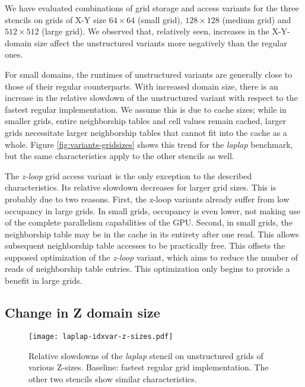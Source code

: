We have evaluated combinations of grid storage and access variants for the three stencils on grids of X-Y size $64\times 64$ (small grid), $128\times 128$ (medium grid) and $512\times 512$ (large grid). We observed that, relatively seen, increases in the X-Y-domain size affect the unstructured variants more negatively than the regular ones.

For small domains, the runtimes of unstructured variants are generally close to those of their regular counterparts. With increased domain size, there is an increase in the relative slowdown of the unstructured variant with respect to the fastest regular implementation. We assume this is due to cache sizes; while in smaller grids, entire neighborship tables and cell values remain cached, larger grids necessitate larger neighborship tables that cannot fit into the cache as a whole. Figure \ref{fig:variants-gridsizes} shows this trend for the \emph{laplap} benchmark, but the same characteristics apply to the other stencils as well.

The \emph{z-loop} grid access variant is the only exception to the described characteristics. Its relative slowdown decreases for larger grid sizes. This is probably due to two reasons. First, the z-loop variants already suffer from low occupancy in large grids. In small grids, occupancy is even lower, not making use of the complete parallelism capabilities of the GPU. Second, in small grids, the neighborship table may be in the cache in its entirety after one read. This allows subsequent neighborship table accesses to be practically free. This offsets the supposed optimization of the \emph{z-loop} variant, which aims to reduce the number of reads of neighborship table entries. This optimization only begins to provide a benefit in large grids.

\subsection{Change in Z domain size}
\label{sec:res-z-size-change}

\begin{figure}
	\begin{center}
    \texttt{[image: laplap-idxvar-z-sizes.pdf]}
	\end{center}
    \caption{\label{fig:laplap-z-sizes} Relative slowdowns of the \emph{laplap} stencil on unstructured grids of various Z-sizes. Baseline: fastest regular grid implementation. The other two stencils show similar characteristics.}
\end{figure}

